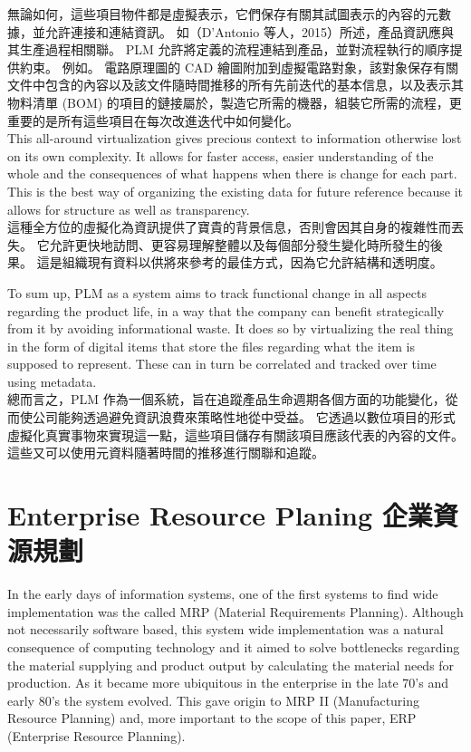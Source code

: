 \fontsize{14pt}{5pt}\sectionef
 {無論如何，這些項目物件都是虛擬表示，它們保存有關其試圖表示的內容的元數據，並允許連接和連結資訊。 如（D’Antonio 等人，2015）所述，產品資訊應與其生產過程相關聯。 PLM 允許將定義的流程連結到產品，並對流程執行的順序提供約束。 例如。 電路原理圖的 CAD 繪圖附加到虛擬電路對象，該對象保存有關文件中包含的內容以及該文件隨時間推移的所有先前迭代的基本信息，以及表示其物料清單 (BOM) 的項目的鏈接屬於，製造它所需的機器，組裝它所需的流程，更重要的是所有這些項目在每次改進迭代中如何變化。}\\[15pt]

\fontsize{14pt}{2.5pt}\sectionef 
{This all-around virtualization gives precious context to information otherwise lost on its own complexity. It allows for faster access, easier understanding of the whole and the consequences of what happens when there is change for each part. This is the best way of organizing the existing data for future reference because it allows for structure as well as transparency.
}\\[1pt]

\fontsize{14pt}{5pt}\sectionef
 {這種全方位的虛擬化為資訊提供了寶貴的背景信息，否則會因其自身的複雜性而丟失。 它允許更快地訪問、更容易理解整體以及每個部分發生變化時所發生的後果。 這是組織現有資料以供將來參考的最佳方式，因為它允許結構和透明度。}\\[15pt]
\newpage

\fontsize{14pt}{2.5pt}\sectionef 
{To sum up, PLM as a system aims to track functional change in all aspects regarding the product life, in a way that the company can benefit strategically from it by avoiding informational waste. It does so by virtualizing the real thing in the form of digital items that store the files regarding what the item is supposed to represent. These can in turn be correlated and tracked over time using metadata.
}\\[1pt]

\fontsize{14pt}{5pt}\sectionef
 {總而言之，PLM 作為一個系統，旨在追蹤產品生命週期各個方面的功能變化，從而使公司能夠透過避免資訊浪費來策略性地從中受益。 它透過以數位項目的形式虛擬化真實事物來實現這一點，這些項目儲存有關該項目應該代表的內容的文件。 這些又可以使用元資料隨著時間的推移進行關聯和追蹤。}\\[15pt]
\section{Enterprise Resource Planing 企業資源規劃}

\fontsize{14pt}{2.5pt}\sectionef 
{In the early days of information systems, one of the first systems to find wide implementation was the called MRP (Material Requirements Planning). Although not necessarily software based, this system wide implementation was a natural consequence of computing technology and it aimed to solve bottlenecks regarding the material supplying and product output by calculating the material needs for production. As it became more ubiquitous in the enterprise in the late 70’s and early 80’s the system evolved. This gave origin to MRP II (Manufacturing Resource Planning) and, more important to the scope of this paper, ERP (Enterprise Resource Planning).}

